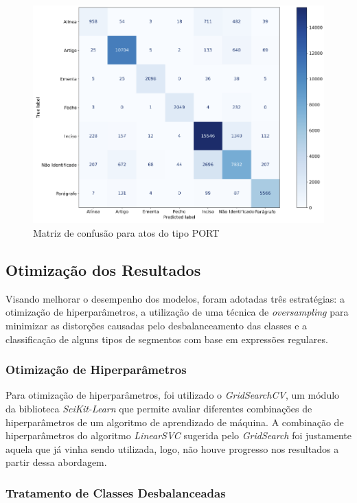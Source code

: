 \begin{figure}[h]
	\caption{Matriz de confusão para atos do tipo PORT}
	\center
	\label{fig:matriz-confusao-port}
	\includegraphics[scale=0.53]{resultados/matriz-confusao-port.png}
	\fdp
\end{figure}

\subsection{Otimização dos Resultados}

Visando melhorar o desempenho dos modelos, foram adotadas três estratégias: a otimização de hiperparâmetros, a utilização de uma técnica de \textit{oversampling} para minimizar as distorções causadas pelo desbalanceamento das classes e a classificação de alguns tipos de segmentos com base em expressões regulares.

\subsubsection{Otimização de Hiperparâmetros}

Para otimização de hiperparâmetros, foi utilizado o \textit{GridSearchCV}, um módulo da biblioteca \textit{SciKit-Learn} que permite avaliar diferentes combinações de hiperparâmetros de um  algoritmo de aprendizado de máquina. A combinação de hiperparâmetros do algoritmo \textit{LinearSVC} sugerida pelo \textit{GridSearch} foi justamente aquela que já vinha sendo utilizada, logo, não houve progresso nos resultados a partir dessa abordagem.

\subsubsection{Tratamento de Classes Desbalanceadas}

